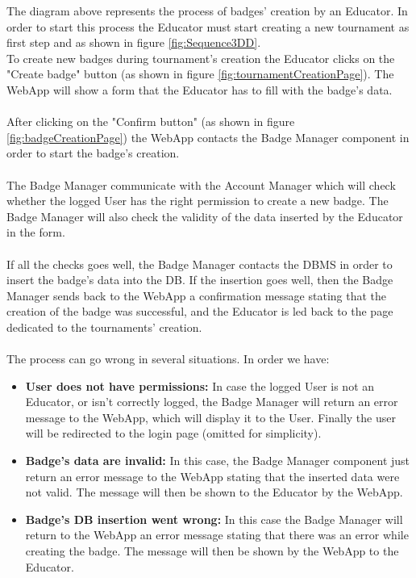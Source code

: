 \documentclass{article}
\begin{document}
{        The diagram above represents the process of badges' creation by an Educator.
        In order to start this process the Educator must start creating a new tournament as first
        step and as shown in figure \ref{fig:Sequence3DD}. \\
        To create new badges during tournament's creation the Educator clicks on the 
        "Create badge" button (as shown in figure \ref{fig:tournamentCreationPage}). 
        The WebApp will show a form that the Educator has to fill with the badge's data. 
        \\ \\
        After clicking on the "Confirm button" (as shown in figure \ref{fig:badgeCreationPage})
        the WebApp contacts the Badge Manager component in order to start the badge's creation.
        \\ \\
        The Badge Manager communicate with the Account Manager which will check whether the 
        logged User has the right permission to create a new badge. The Badge Manager will also
        check the validity of the data inserted by the Educator in the form.
        \\ \\
        If all the checks goes well, the Badge Manager contacts the DBMS in order to insert the
        badge's data into the DB.
        If the insertion goes well, then the Badge Manager sends back to the WebApp a confirmation
        message stating that the creation of the badge was successful, and the Educator is led back
        to the page dedicated to the tournaments' creation.
        \\ \\
        The process can go wrong in several situations. In order we have:
        \begin{itemize}
            \item \textbf{User does not have permissions:} In case the logged User is not an
            Educator, or isn't correctly logged, the Badge Manager will return an
            error message to the WebApp, which will display it to the User.
            Finally the user will be redirected to the login page (omitted for simplicity).
            \item \textbf{Badge's data are invalid:} In this case, the Badge Manager component 
            just return an error message to the WebApp stating that the inserted data were not 
            valid. The message will then be shown to the Educator by the WebApp.
            \item \textbf{Badge's DB insertion went wrong:} In this case the Badge Manager will 
            return to the WebApp an error message stating that there was an error while creating 
            the badge. The message will then be shown by the WebApp to the Educator.
        \end{itemize}

}
\end{document}
